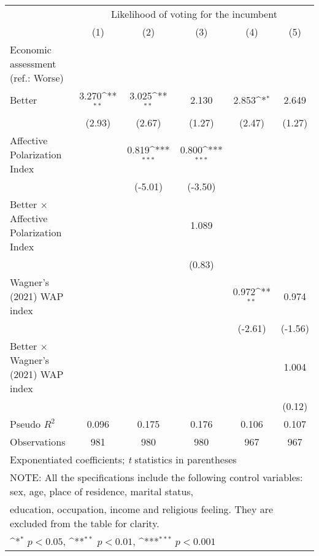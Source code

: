 {
\def\sym#1{\ifmmode^{#1}\else\(^{#1}\)\fi}
\begin{tabular}{l*{5}{c}}
\toprule
                &\multicolumn{5}{c}{Likelihood of voting for the incumbent}                                    \\\cmidrule(lr){2-6}
                &\multicolumn{1}{c}{(1)}         &\multicolumn{1}{c}{(2)}         &\multicolumn{1}{c}{(3)}         &\multicolumn{1}{c}{(4)}         &\multicolumn{1}{c}{(5)}         \\
\midrule
Economic assessment (ref.: Worse)&                  &                  &                  &                  &                  \\
Better          &    3.270\sym{**} &    3.025\sym{**} &    2.130         &    2.853\sym{*}  &    2.649         \\
                &   (2.93)         &   (2.67)         &   (1.27)         &   (2.47)         &   (1.27)         \\
Affective Polarization Index&                  &    0.819\sym{***}&    0.800\sym{***}&                  &                  \\
                &                  &  (-5.01)         &  (-3.50)         &                  &                  \\
Better $\times$ Affective Polarization Index&                  &                  &    1.089         &                  &                  \\
                &                  &                  &   (0.83)         &                  &                  \\
Wagner's (2021) WAP index&                  &                  &                  &    0.972\sym{**} &    0.974         \\
                &                  &                  &                  &  (-2.61)         &  (-1.56)         \\
Better $\times$ Wagner's (2021) WAP index&                  &                  &                  &                  &    1.004         \\
                &                  &                  &                  &                  &   (0.12)         \\
\midrule
Pseudo \(R^{2}\)&    0.096         &    0.175         &    0.176         &    0.106         &    0.107         \\
Observations    &      981         &      980         &      980         &      967         &      967         \\
\bottomrule
\multicolumn{6}{l}{\footnotesize Exponentiated coefficients; \textit{t} statistics in parentheses}\\
\multicolumn{6}{l}{\footnotesize NOTE: All the specifications include the following control variables: sex, age, place of residence, marital status,}\\
\multicolumn{6}{l}{\footnotesize education, occupation, income and religious feeling. They are excluded from the table for clarity.}\\
\multicolumn{6}{l}{\footnotesize \sym{*} \(p<0.05\), \sym{**} \(p<0.01\), \sym{***} \(p<0.001\)}\\
\end{tabular}
}
